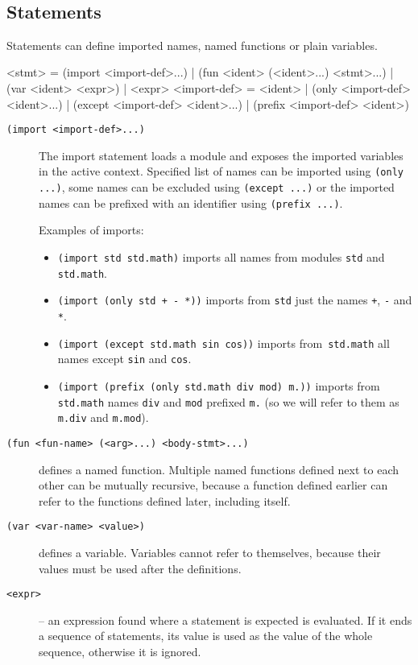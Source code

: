 ~
\subsection{Statements}

Statements can define imported names, named functions or plain variables.

\begin{ttcode}
<stmt>        = (import <import-def>...)
              | (fun <ident> (<ident>...) <stmt>...)
              | (var <ident> <expr>)
              | <expr>
<import-def>  = <ident>
              | (only <import-def> <ident>...)
              | (except <import-def> <ident>...)
              | (prefix <import-def> <ident>)
\end{ttcode}

\begin{description}

\item[\texttt{(import <import-def>...)}] The import statement loads a module and
  exposes the imported variables in the active context. Specified list of names
  can be imported using \texttt{(only ...)}, some names can be excluded using
  \texttt{(except ...)} or the imported names can be prefixed with an identifier
  using \texttt{(prefix ...)}.

  Examples of imports:

  \begin{itemize}
    \item \texttt{(import std std.math)} imports all names from modules
      \texttt{std} and \texttt{std.math}.
    \item \texttt{(import (only std + - *))} imports from \texttt{std} just the
      names \texttt{+}, \texttt{-} and \texttt{*}.
    \item \texttt{(import (except std.math sin cos))} imports
      from~\texttt{std.math} all names except \texttt{sin} and \texttt{cos}.
    \item \texttt{(import (prefix (only std.math div mod) m.))} imports from
      \texttt{std.math} names \texttt{div} and \texttt{mod} prefixed
      \texttt{m.} (so we will refer to them as \texttt{m.div} and \texttt{m.mod}).
  \end{itemize}

\item[\texttt{(fun <fun-name> (<arg>...) <body-stmt>...)}] defines a named
  function. Multiple named functions defined next to each other can be mutually
  recursive, because a function defined earlier can refer to the functions
  defined later, including itself.

\item[\texttt{(var <var-name> <value>)}] defines a variable. Variables cannot
  refer to themselves, because their values must be used after the definitions.

\item[\texttt{<expr>}] -- an expression found where a statement is expected is
  evaluated. If it ends a sequence of statements, its value is used as the value
  of the whole sequence, otherwise it is ignored.

\end{description}

